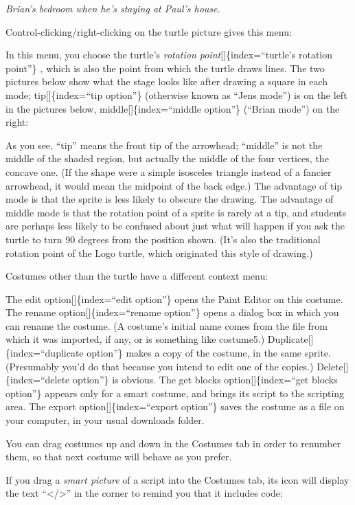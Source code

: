 \documentclass[
  letterpaper,
]{book}
\begin{document}
\emph{Brian's bedroom when he's staying at Paul's house.}

Control-clicking/right-clicking on the turtle picture gives this menu:

In this menu, you choose the turtle's \emph{rotation
point}{[}{]}\{index=``turtle's rotation point''\} \emph{,} which is also
the point from which the turtle draws lines. The two pictures below show
what the stage looks like after drawing a square in each mode;
tip{[}{]}\{index=``tip option''\} (otherwise known as ``Jens mode'') is
on the left in the pictures below, middle{[}{]}\{index=``middle
option''\} (``Brian mode'') on the right:

As you see, ``tip'' means the front tip of the arrowhead; ``middle'' is
not the middle of the shaded region, but actually the middle of the four
vertices, the concave one. (If the shape were a simple isosceles
triangle instead of a fancier arrowhead, it would mean the midpoint of
the back edge.) The advantage of tip mode is that the sprite is less
likely to obscure the drawing. The advantage of middle mode is that the
rotation point of a sprite is rarely at a tip, and students are perhaps
less likely to be confused about just what will happen if you ask the
turtle to turn 90 degrees from the position shown. (It's also the
traditional rotation point of the Logo turtle, which originated this
style of drawing.)

Costumes other than the turtle have a different context menu:

The edit option{[}{]}\{index=``edit option''\} opens the Paint Editor on
this costume. The rename option{[}{]}\{index=``rename option''\} opens a
dialog box in which you can rename the costume. (A costume's initial
name comes from the file from which it was imported, if any, or is
something like costume5.) Duplicate{[}{]}\{index=``duplicate option''\}
makes a copy of the costume, in the same sprite. (Presumably you'd do
that because you intend to edit one of the copies.)
Delete{[}{]}\{index=``delete option''\} is obvious. The get blocks
option{[}{]}\{index=``get blocks option''\} appears only for a smart
costume, and brings its script to the scripting area. The export
option{[}{]}\{index=``export option''\} saves the costume as a file on
your computer, in your usual downloads folder.

You can drag costumes up and down in the Costumes tab in order to
renumber them, so that next costume will behave as you prefer.

If you drag a \emph{smart picture} of a script into the Costumes tab,
its icon will display the text ``\textless/\textgreater{}'' in the
corner to remind you that it includes code:
\end{document}
